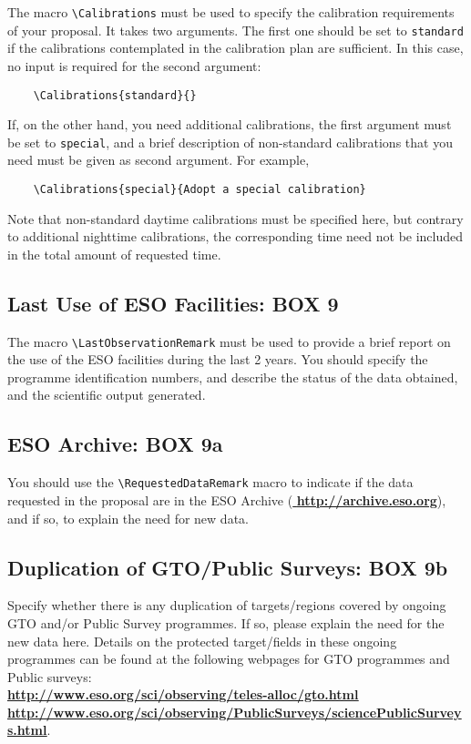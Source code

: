 \documentclass{article}
\begin{document}
The macro \verb|\Calibrations| must be used to specify the calibration
requirements of your proposal. It takes two arguments. The first one
should be set to \verb|standard| if the calibrations contemplated in
the calibration plan are sufficient. In this case, no input is
required for the second argument:
\begin{verbatim}
    \Calibrations{standard}{}
\end{verbatim} 
If, on the other hand, you need
additional calibrations, the first argument must be set to
\verb|special|, and a brief description of non-standard calibrations
that you need must be given as second argument. For example,
\begin{verbatim}
    \Calibrations{special}{Adopt a special calibration}
\end{verbatim} 
Note that non-standard
daytime calibrations must be specified here, but contrary to
additional nighttime calibrations, the corresponding time need not 
be included in the total amount of requested time. 


\subsection{Last Use of ESO Facilities: {\bf BOX 9}}
The macro \verb|\LastObservationRemark| must be used to 
provide a brief report on the use of the ESO facilities during the
last 2 years. You should specify the programme identification
numbers, and describe the status of the data obtained, and the 
scientific output generated.

\subsection{ESO Archive: {\bf BOX 9a}}
You should use the \verb|\RequestedDataRemark| macro to indicate if
the data requested in the proposal are in the ESO Archive
(\href{http://archive.eso.org}{\bf
  \underline{http://archive.eso.org}}), and if so, to explain the
need for new data.

\subsection{Duplication of GTO/Public Surveys: {\bf BOX 9b}}

Specify whether there is any duplication of targets/regions covered by ongoing GTO and/or Public Survey
programmes. 
If so, please explain the need for the new data here. Details on the protected target/fields in these
ongoing programmes can be found at the following webpages for GTO programmes and Public surveys: \\
\href{http://www.eso.org/sci/observing/teles-alloc/gto.html}
{\bf  \underline{http://www.eso.org/sci/observing/teles-alloc/gto.html}}\\
\href{http://www.eso.org/sci/observing/PublicSurveys/sciencePublicSurveys.html}
{\bf \underline{http://www.eso.org/sci/observing/PublicSurveys/sciencePublicSurveys.html}}.
\end{document}
